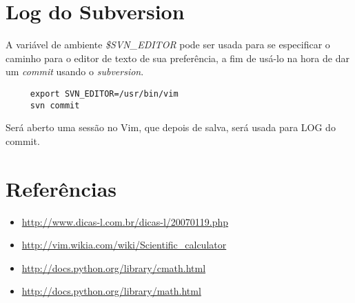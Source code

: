 \section{Log do Subversion}

A variável de ambiente {\em \$SVN\_EDITOR} pode ser usada para se especificar o caminho para o editor de texto de
sua preferência, a fim de usá-lo na hora de dar um {\em commit} usando o {\em subversion}.

\begin{verbatim}
     export SVN_EDITOR=/usr/bin/vim
     svn commit
\end{verbatim}

Será aberto uma sessão no Vim, que depois de salva, será usada para LOG do commit.

\section{Referências}

\begin{itemize}
 \item \url{http://www.dicas-l.com.br/dicas-l/20070119.php}
 \item \url{http://vim.wikia.com/wiki/Scientific_calculator}
 \item \url{http://docs.python.org/library/cmath.html}
 \item \url{http://docs.python.org/library/math.html}
\end{itemize}

